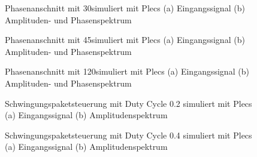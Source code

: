 \begin{appendix}
\begin{figure}[ht!]
	\centering
	\qquad
	\caption{Phasenanschnitt mit 30\textdegree simuliert mit Plecs (a) Eingangssignal (b) Amplituden- und Phasenspektrum}
	\label{fig:Plecs_mit_phasenanschnitt_30}
\end{figure}

\newpage

\begin{figure}[ht!]
	\centering
	\qquad
	\caption{Phasenanschnitt mit 45\textdegree simuliert mit Plecs (a) Eingangssignal (b) Amplituden- und Phasenspektrum}
	\label{fig:Plecs_mit_phasenanschnitt_45}
\end{figure}


\begin{figure}[ht!]
	\centering
	\qquad
	\caption{Phasenanschnitt mit 120\textdegree simuliert mit Plecs (a) Eingangssignal (b) Amplituden- und Phasenspektrum}
	\label{fig:Plecs_mit_phasenanschnitt_120}
\end{figure}


\begin{figure}[ht!]
	\centering
	\qquad
	\caption{Schwingungspaketsteuerung mit Duty Cycle 0.2 simuliert mit Plecs (a) Eingangssignal (b) Amplitudenspektrum}
	\label{fig:Schwingungspaketsteuerung_mit_duty_cycle_0_2 simuliert_mit_Plecs}
\end{figure}

\newpage

\begin{figure}[ht!]
	\centering
	\qquad
	\caption{Schwingungspaketsteuerung mit Duty Cycle 0.4 simuliert mit Plecs (a) Eingangssignal (b) Amplitudenspektrum}
	\label{fig:Schwingungspaketsteuerung_mit_duty_cycle_0_4 simuliert_mit_Plecs}
\end{figure}



\end{appendix}
